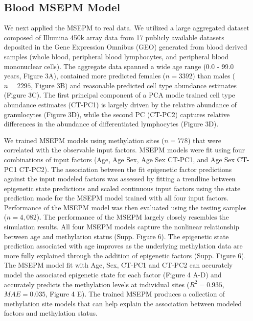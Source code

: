 \documentclass{article}
\begin{document}
{\begin{linenumbers}
\subsection{Blood MSEPM Model}
We next applied the MSEPM to real data.  We utilized a large aggregated dataset composed of Illumina 450k array data from 17 publicly available datasets\cite{Ventham2016-qj,Demetriou2013-wb,Polidoro2013-xv,Johansson2013-of,Arloth2020-lo,Liu2013-dg,Soriano-Tarraga2016-uq,Chuang2017-nk,
Zannas2019-me,Kurushima2019-pe,Voisin2015-lh,Tan2014-sg,Tserel2015-ro,Butcher2017-oz,Dabin2020-iw,Marabita2013-cj,ValleG2019-xi}
 deposited in the Gene Expression Omnibus\cite{Barrett2012-gu} (GEO) generated from blood derived samples (whole blood, peripheral blood lymphocytes, and 
peripheral blood mononuclear cells). The aggregate data spanned a wide age range (0.0  - 99.0 years, Figure 3A), contained more predicted females ($n=3392$) than males ($n=2295$, Figure 3B) 
and reasonable predicted cell type abundance estimates (Figure 3C). The first principal component of a PCA modle trained cell type abundance estimates (CT-PC1) is 
largely driven by the relative abundance of granulocytes (Figure 3D), while the second PC (CT-PC2) captures relative 
differences in the abundance of differentiated lymphocytes (Figure 3D).  

We trained MSEPM models using methylation sites ($n=778$) that were correlated with the observable input factors. 
MSEPM models were fit using four combinations of input factors (Age, Age Sex, Age Sex CT-PC1, and Age Sex CT-PC1 CT-PC2). 
The association between the fit epigenetic factor predictions against the input modeled factors was assessed by 
fitting a trendline between epigenetic state predictions and scaled continuous input factors using the state 
prediction made for the MSEPM model trained with all four input factors. Performance of the MSEPM model was then 
evaluated using the testing samples ($n=4,082$). The performance of the MSEPM largely closely resembles the 
simulation results. All four MSEPM models capture the nonlinear relationship between age and 
methylation status (Supp. Figure 6). The epigenetic state prediction associated with age improves as 
the underlying methylation data are more fully explained through the addition of epigenetic factors (Supp. Figure 6).
The MSEPM model fit with Age, Sex, CT-PC1 and CT-PC2 can accurately model the associated epigenetic state 
for each factor (Figure 4 A-D) and accurately predicts the methylation levels at individual sites ($R^2=0.935$, $MAE=0.035$, Figure 4 E). 
The trained MSEPM produces a collection of methylation site models that can help explain the association between modeled factors and methylation status. 


\end{linenumbers}}
\end{document}
